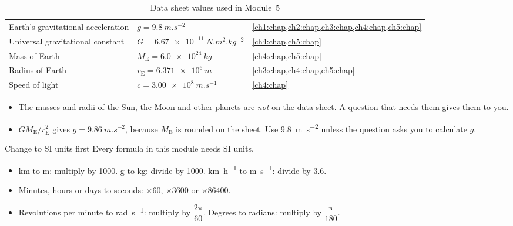 \begin{table}
  \caption*{Data sheet values used in Module~5}
  \centering
  \begin{tabular}{@{}L{55mm}L{48mm}L{37mm}@{}}
    \toprule
     &  & \\
    \midrule
    Earth's gravitational acceleration & $g = \qty{9.8}{m.s^{-2}}$ & \cref{ch1:chap,ch2:chap,ch3:chap,ch4:chap,ch5:chap}\\
    Universal gravitational constant & $G = \qty{6.67e-11}{N.m^2.kg^{-2}}$ & \cref{ch4:chap,ch5:chap}\\
    Mass of Earth & $M_\mathrm{E} = \qty{6.0e24}{kg}$ & \cref{ch4:chap,ch5:chap}\\
    Radius of Earth & $r_\mathrm{E} = \qty{6.371e6}{m}$ & \cref{ch3:chap,ch4:chap,ch5:chap}\\
    Speed of light & $c = \qty{3.00e8}{m.s^{-1}}$ & \cref{ch4:chap}\\
    \bottomrule
  \end{tabular}
\end{table}

\begin{itemize}
  \item The masses and radii of the Sun, the Moon and other planets are \emph{not} on the data
        sheet. A question that needs them gives them to you.
  \item $GM_\mathrm{E}/r_\mathrm{E}^2$ gives $g = \qty{9.86}{m.s^{-2}}$, because $M_\mathrm{E}$ is
        rounded on the sheet. Use \qty{9.8}{m.s^{-2}} unless the question asks you to calculate $g$.
\end{itemize}

\begin{toolkit}{Change to SI units first}
Every formula in this module needs SI units.
\begin{itemize}
  \item \si{km} to \si{m}: multiply by 1000. \si{g} to \si{kg}: divide by 1000.
        \si{km.h^{-1}} to \si{m.s^{-1}}: divide by 3.6.
  \item Minutes, hours or days to seconds: $\times 60$, $\times 3600$ or $\times \num{86400}$.
  \item Revolutions per minute to \si{rad.s^{-1}}: multiply by $\dfrac{2\pi}{60}$. Degrees to
        radians: multiply by $\dfrac{\pi}{180}$.
\end{itemize}
\end{toolkit}
